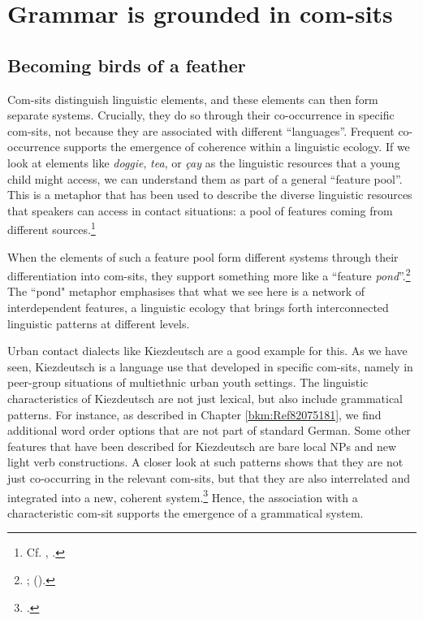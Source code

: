 \chapter{Grammar is grounded in com-sits}\label{chap:4}
\label{bkm:Ref112935602}\hypertarget{Toc125444660}{}\section{Becoming birds of a feather}
\label{bkm:Ref114133435}\hypertarget{Toc125444661}{}
Com-sits distinguish linguistic elements, and these elements can then form separate systems. Crucially, they do so through their co-oc\-cur\-rence in specific com-sits, not because they are associated with different ``languages''. Frequent co-occurrence supports the emergence of coherence within a linguistic ecology. If we look at elements like \textit{doggie}, \textit{tea}, or \textit{çay} as the linguistic resources that a young child might access, we can understand them as part of a general “feature pool”. This is a metaphor that has been used to describe the diverse linguistic resources that speakers can access in contact situations: a pool of features coming from different sources.\footnote{Cf. \citet{Mufwene2001}, \citet{CheshireEtAl2011}.}

When the elements of such a feature pool form different systems through their differentiation into com-sits, they support something more like a “feature \textit{pond}”.\footnote{\citet{Wiese2013}; (\citeyear{Wiese2022}).} The “pond" metaphor emphasises that what we see here is a network of interdependent features, a linguistic ecology that brings forth interconnected linguistic patterns at different levels.

Urban contact dialects like Kiezdeutsch are a good example for this. As we have seen, Kiezdeutsch is a language use that developed in specific com-sits, namely in peer-group situations of multiethnic urban youth settings. The linguistic characteristics of Kiezdeutsch are not just lexical, but also include grammatical patterns. For instance, as described in Chapter \ref{bkm:Ref82075181}, we find additional word order options that are not part of standard German. Some other features that have been described for Kiezdeutsch are bare local NPs and new light verb constructions. A closer look at such patterns shows that they are not just co-occurring in the relevant com-sits, but that they are also interrelated and integrated into a new, coherent system.\footnote{\citet{WieseRehbein2015}.} Hence, the association with a characteristic com-sit supports the emergence of a grammatical system.


